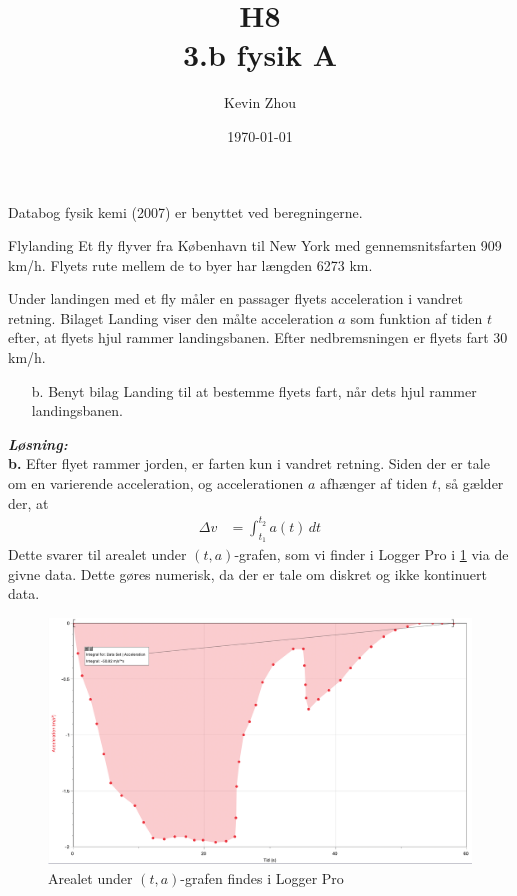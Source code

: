 \documentclass{report}
\title{H8\\
{\Large \textbf{3.b fysik A}}}
\author{Kevin Zhou}
\date{\today}
\newcommand{\sol}{\setlength{\parindent}{0cm}\textbf{\textit{Løsning:}}\setlength{\parindent}{1cm}}
\begin{document}
\maketitle
\begin{note}
  Databog fysik kemi (2007) er benyttet ved beregningerne.
\end{note}
\begin{question}{Flylanding}{}
  Et fly flyver fra København til New York med gennemsnitsfarten 909 km/h. Flyets rute mellem de to byer har længden 6273 km.

Under landingen med et fly måler en passager flyets acceleration i vandret retning. Bilaget Landing viser den målte acceleration $a$ som funktion af tiden $t$ efter, at flyets hjul rammer landingsbanen. Efter nedbremsningen er flyets fart 30 km/h.
\begin{itemize}
  \item[b.] Benyt bilag Landing til at bestemme flyets fart, når dets hjul rammer landingsbanen.
\end{itemize}
\end{question}
\sol \\
\textbf{b.}
Efter flyet rammer jorden, er farten kun i vandret retning.
Siden der er tale om en varierende acceleration, og accelerationen $a$ afhænger af tiden $t$, så gælder der, at
\begin{equation*}
\begin{split}
  \Delta v&=\int_{t_1}^{t_2} a(t) \,dt 
\end{split}
\end{equation*}
Dette svarer til arealet under $(t,a)$-grafen, som vi finder i Logger Pro i \cref{fig:landing} via de givne data.
Dette gøres numerisk, da der er tale om diskret og ikke kontinuert data.
\begin{figure}[H]
\begin{center}
  \includegraphics[width=\textwidth]{landing.png}
\end{center}
  \caption{Arealet under $(t,a)$-grafen findes i Logger Pro}
\label{fig:landing}
\end{figure}
\end{document}
